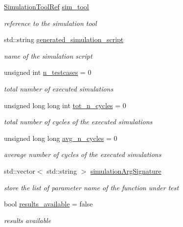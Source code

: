\begin{DoxyCompactItemize}
\hyperlink{SimulationTool_8hpp_ac6ee25f5bd64bf5c2795c731e142d3c6}{Simulation\+Tool\+Ref} \hyperlink{classSimulationInformation_ada96b770254fdb82fe8236952f19b79d}{sim\+\_\+tool}
\begin{DoxyCompactList}\small\item\em reference to the simulation tool \end{DoxyCompactList}\item 
std\+::string \hyperlink{classSimulationInformation_aff6f01df88f48bf17e8e77121f804f30}{generated\+\_\+simulation\+\_\+script}
\begin{DoxyCompactList}\small\item\em name of the simulation script \end{DoxyCompactList}\item 
unsigned int \hyperlink{classSimulationInformation_ad0811b9b2333103a7bb8042a9094e9bb}{n\+\_\+testcases} = 0
\begin{DoxyCompactList}\small\item\em total number of executed simulations \end{DoxyCompactList}\item 
unsigned long long int \hyperlink{classSimulationInformation_a643f38c4c50bfaffda485b87fb3a70e5}{tot\+\_\+n\+\_\+cycles} = 0
\begin{DoxyCompactList}\small\item\em total number of cycles of the executed simulations \end{DoxyCompactList}\item 
unsigned long long \hyperlink{classSimulationInformation_a9d2b0b5f11debd0a38454157d84444a0}{avg\+\_\+n\+\_\+cycles} = 0
\begin{DoxyCompactList}\small\item\em average number of cycles of the executed simulations \end{DoxyCompactList}\item 
std\+::vector$<$ std\+::string $>$ \hyperlink{classSimulationInformation_acd59782d6a20b7a0f94345507d9544f5}{simulation\+Arg\+Signature}
\begin{DoxyCompactList}\small\item\em store the list of parameter name of the function under test \end{DoxyCompactList}\item 
bool \hyperlink{classSimulationInformation_a296958989f9c4c8e896494f0c4e56a25}{results\+\_\+available} = false
\begin{DoxyCompactList}\small\item\em results available \end{DoxyCompactList}\end{DoxyCompactItemize}


